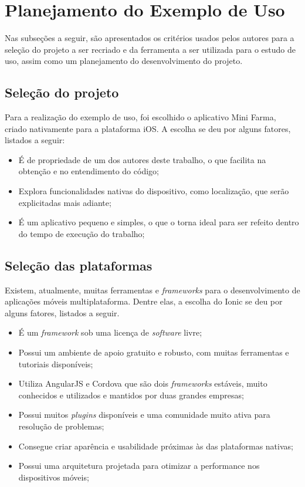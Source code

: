 \section{Planejamento do Exemplo de Uso} \label{section:planejamentoestudodecaso}

Nas subseções a seguir, são apresentados os critérios usados pelos autores para a seleção do projeto a ser recriado e da ferramenta a ser utilizada para o estudo de uso, assim como um planejamento
do desenvolvimento do projeto.

\subsection{Seleção do projeto} \label{subsection:selecaodoprojeto}

Para a realização do exemplo de uso, foi escolhido o aplicativo Mini Farma, criado nativamente para a plataforma iOS. A escolha se deu por alguns fatores, listados a seguir:

\begin{itemize}
    \item É de propriedade de um dos autores deste trabalho, o que facilita na obtenção e no entendimento do código;
    \item Explora funcionalidades nativas do dispositivo, como localização, que serão explicitadas mais adiante;
    \item É um aplicativo pequeno e simples, o que o torna ideal para ser refeito dentro do tempo de execução do trabalho;
\end{itemize}

\subsection{Seleção das plataformas} \label{subsection:selecaodasplataformas}

Existem, atualmente, muitas ferramentas e \textit{frameworks} para o desenvolvimento de aplicações móveis multiplataforma. Dentre elas, a escolha do Ionic se deu por alguns fatores, listados a seguir. 

\begin{itemize}
    \item É um \textit{framework} sob uma licença de \textit{software} livre;
    \item Possui um ambiente de apoio gratuito e robusto, com muitas ferramentas e tutoriais disponíveis;
    \item Utiliza AngularJS e Cordova que são dois \textit{frameworks} estáveis, muito conhecidos e utilizados e mantidos por duas grandes empresas;
    \item Possui muitos \textit{plugins} disponíveis e uma comunidade muito ativa para resolução de problemas; %
    \item Consegue criar aparência e usabilidade próximas às das plataformas nativas; %
    \item Possui uma arquitetura projetada para otimizar a performance nos dispositivos móveis; 
\end{itemize}
 
